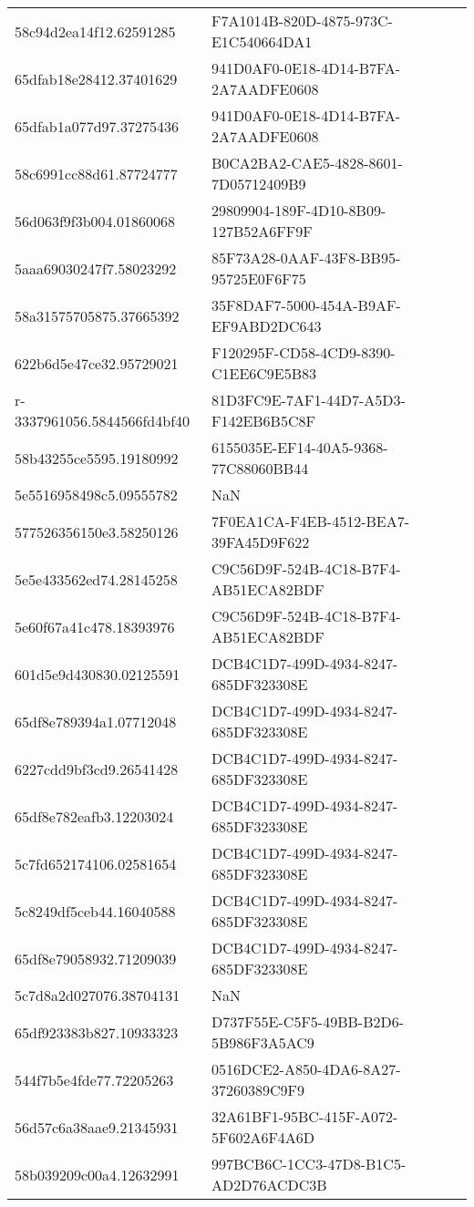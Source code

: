 \begin{tabular}{ll}
58c94d2ea14f12.62591285 & F7A1014B-820D-4875-973C-E1C540664DA1 \\
65dfab18e28412.37401629 & 941D0AF0-0E18-4D14-B7FA-2A7AADFE0608 \\
65dfab1a077d97.37275436 & 941D0AF0-0E18-4D14-B7FA-2A7AADFE0608 \\
58c6991cc88d61.87724777 & B0CA2BA2-CAE5-4828-8601-7D05712409B9 \\
56d063f9f3b004.01860068 & 29809904-189F-4D10-8B09-127B52A6FF9F \\
5aaa69030247f7.58023292 & 85F73A28-0AAF-43F8-BB95-95725E0F6F75 \\
58a31575705875.37665392 & 35F8DAF7-5000-454A-B9AF-EF9ABD2DC643 \\
622b6d5e47ce32.95729021 & F120295F-CD58-4CD9-8390-C1EE6C9E5B83 \\
r-3337961056.5844566fd4bf40 & 81D3FC9E-7AF1-44D7-A5D3-F142EB6B5C8F \\
58b43255ce5595.19180992 & 6155035E-EF14-40A5-9368-77C88060BB44 \\
5e5516958498c5.09555782 & NaN \\
577526356150e3.58250126 & 7F0EA1CA-F4EB-4512-BEA7-39FA45D9F622 \\
5e5e433562ed74.28145258 & C9C56D9F-524B-4C18-B7F4-AB51ECA82BDF \\
5e60f67a41c478.18393976 & C9C56D9F-524B-4C18-B7F4-AB51ECA82BDF \\
601d5e9d430830.02125591 & DCB4C1D7-499D-4934-8247-685DF323308E \\
65df8e789394a1.07712048 & DCB4C1D7-499D-4934-8247-685DF323308E \\
6227cdd9bf3cd9.26541428 & DCB4C1D7-499D-4934-8247-685DF323308E \\
65df8e782eafb3.12203024 & DCB4C1D7-499D-4934-8247-685DF323308E \\
5c7fd652174106.02581654 & DCB4C1D7-499D-4934-8247-685DF323308E \\
5c8249df5ceb44.16040588 & DCB4C1D7-499D-4934-8247-685DF323308E \\
65df8e79058932.71209039 & DCB4C1D7-499D-4934-8247-685DF323308E \\
5c7d8a2d027076.38704131 & NaN \\
65df923383b827.10933323 & D737F55E-C5F5-49BB-B2D6-5B986F3A5AC9 \\
544f7b5e4fde77.72205263 & 0516DCE2-A850-4DA6-8A27-37260389C9F9 \\
56d57c6a38aae9.21345931 & 32A61BF1-95BC-415F-A072-5F602A6F4A6D \\
58b039209c00a4.12632991 & 997BCB6C-1CC3-47D8-B1C5-AD2D76ACDC3B \\

\end{tabular}
